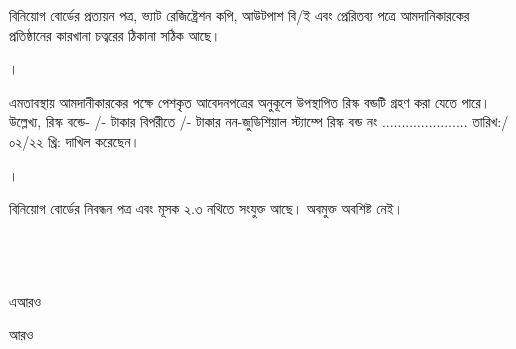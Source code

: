 \documentclass[12pt]{article}
\newcommand{\riskbonddate}{\hspace{2em}/০২/২২ খ্রি:}
\newcommand{\riskbondno}{......................}
\newcommand{\riskbondt}{/-}
\newcommand{\riskbondg}{/-}
\begin{document}
\begin{minipage}[t]{0.96\linewidth}
বিনিয়োগ বোর্ডের প্রত্যয়ন পত্র,
ভ্যাট রেজিষ্ট্রেশন কপি,
আউটপাশ বি/ই এবং প্রেরিতব্য পত্রে
আমদানিকারকের প্রতিষ্ঠানের কারখানা চত্বরের
ঠিকানা সঠিক আছে।
\\
\end{minipage}
\begin{minipage}[t]{0.04\linewidth}
।
\end{minipage}
\begin{minipage}[t]{0.96\linewidth}
এমতাবস্থায় আমদানীকারকের পক্ষে
পেশকৃত আবেদনপত্রের অনুকূলে
উপস্থাপিত রিস্ক বন্ডটি গ্রহণ করা যেতে পারে।
উল্লেখ্য, রিস্ক বন্ডে-
{\riskbondt}
টাকার বিপরীতে
{\riskbondg}
টাকার নন-জুডিশিয়াল
স্ট্যাম্পে রিস্ক বন্ড নং {\riskbondno}
{তারিখ:\riskbonddate} দাখিল করেছেন।
\\
\end{minipage}
\begin{minipage}[t]{0.04\linewidth}
।
\end{minipage}
\begin{minipage}[t]{0.96\linewidth}
বিনিয়োগ বোর্ডের নিবন্ধন পত্র এবং
মূসক ২.৩ নথিতে সংযুক্ত আছে।
অবমুক্ত অবশিষ্ট নেই।
\\
\\
\\
\\
\end{minipage}
\normalsize
\begin{minipage}[t]{0.6\linewidth}
\hspace{1em}
\end{minipage}
\begin{minipage}[t]{0.2\linewidth}
এআরও
\end{minipage}
\begin{minipage}[t]{0.2\linewidth}
আরও
\end{minipage}
\thispagestyle{laststyle}
\end{document}
